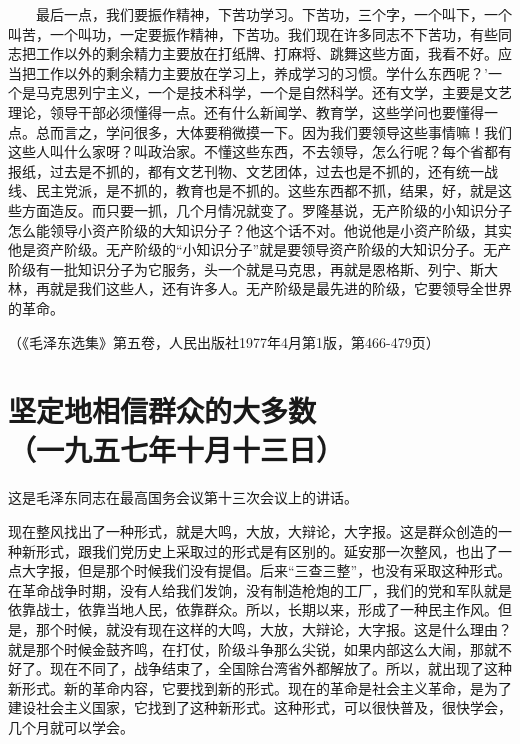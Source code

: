 \documentclass[cn,11pt,chinese]{elegantbook}
\def\myformat#1{\hfil\hfil #1}
\begin{document}
　　最后一点，我们要振作精神，下苦功学习。下苦功，三个字，一个叫下，一个叫苦，一个叫功，一定要振作精神，下苦功。我们现在许多同志不下苦功，有些同志把工作以外的剩余精力主要放在打纸牌、打麻将、跳舞这些方面，我看不好。应当把工作以外的剩余精力主要放在学习上，养成学习的习惯。学什么东西呢？’一个是马克思列宁主义，一个是技术科学，一个是自然科学。还有文学，主要是文艺理论，领导干部必须懂得一点。还有什么新闻学、教育学，这些学问也要懂得一点。总而言之，学问很多，大体要稍微摸一下。因为我们要领导这些事情嘛！我们这些人叫什么家呀？叫政治家。不懂这些东西，不去领导，怎么行呢？每个省都有报纸，过去是不抓的，都有文艺刊物、文艺团体，过去也是不抓的，还有统一战线、民主党派，是不抓的，教育也是不抓的。这些东西都不抓，结果，好，就是这些方面造反。而只要一抓，几个月情况就变了。罗隆基说，无产阶级的小知识分子怎么能领导小资产阶级的大知识分子？他这个话不对。他说他是小资产阶级，其实他是资产阶级。无产阶级的“小知识分子”就是要领导资产阶级的大知识分子。无产阶级有一批知识分子为它服务，头一个就是马克思，再就是恩格斯、列宁、斯大林，再就是我们这些人，还有许多人。无产阶级是最先进的阶级，它要领导全世界的革命。\\
\begin{flushright}（《毛泽东选集》第五卷，人民出版社1977年4月第1版，第466-479页）\end{flushright}
\newpage\section*{\myformat{坚定地相信群众的大多数}\\\myformat{（一九五七年十月十三日）}}
\begin{introduction}\item 这是毛泽东同志在最高国务会议第十三次会议上的讲话。\end{introduction}
现在整风找出了一种形式，就是大鸣，大放，大辩论，大字报。这是群众创造的一种新形式，跟我们党历史上采取过的形式是有区别的。延安那一次整风，也出了一点大字报，但是那个时候我们没有提倡。后来“三查三整”，也没有采取这种形式。在革命战争时期，没有人给我们发饷，没有制造枪炮的工厂，我们的党和军队就是依靠战士，依靠当地人民，依靠群众。所以，长期以来，形成了一种民主作风。但是，那个时候，就没有现在这样的大鸣，大放，大辩论，大字报。这是什么理由？就是那个时候金鼓齐鸣，在打仗，阶级斗争那么尖锐，如果内部这么大闹，那就不好了。现在不同了，战争结束了，全国除台湾省外都解放了。所以，就出现了这种新形式。新的革命内容，它要找到新的形式。现在的革命是社会主义革命，是为了建设社会主义国家，它找到了这种新形式。这种形式，可以很快普及，很快学会，几个月就可以学会。\\
\end{document}

